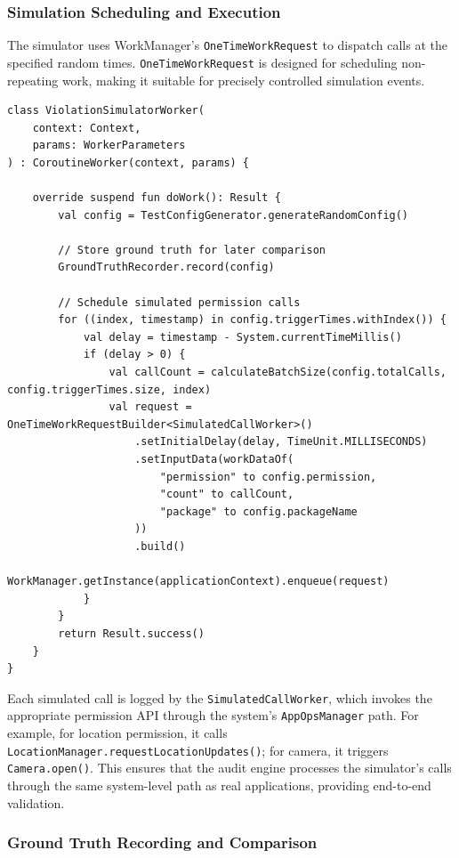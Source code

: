\subsubsection{Simulation Scheduling and Execution}

The simulator uses WorkManager's \texttt{OneTimeWorkRequest} to dispatch calls at the specified random times. \texttt{OneTimeWorkRequest} is designed for scheduling non-repeating work, making it suitable for precisely controlled simulation events.

\begin{lstlisting}[caption=Violation simulator worker]
class ViolationSimulatorWorker(
    context: Context,
    params: WorkerParameters
) : CoroutineWorker(context, params) {
    
    override suspend fun doWork(): Result {
        val config = TestConfigGenerator.generateRandomConfig()
        
        // Store ground truth for later comparison
        GroundTruthRecorder.record(config)
        
        // Schedule simulated permission calls
        for ((index, timestamp) in config.triggerTimes.withIndex()) {
            val delay = timestamp - System.currentTimeMillis()
            if (delay > 0) {
                val callCount = calculateBatchSize(config.totalCalls, config.triggerTimes.size, index)
                val request = OneTimeWorkRequestBuilder<SimulatedCallWorker>()
                    .setInitialDelay(delay, TimeUnit.MILLISECONDS)
                    .setInputData(workDataOf(
                        "permission" to config.permission,
                        "count" to callCount,
                        "package" to config.packageName
                    ))
                    .build()
                WorkManager.getInstance(applicationContext).enqueue(request)
            }
        }
        return Result.success()
    }
}
\end{lstlisting}

Each simulated call is logged by the \texttt{SimulatedCallWorker}, which invokes the appropriate permission API through the system's \texttt{AppOpsManager} path. For example, for location permission, it calls \texttt{LocationManager.requestLocationUpdates()}; for camera, it triggers \texttt{Camera.open()}. This ensures that the audit engine processes the simulator's calls through the same system-level path as real applications, providing end-to-end validation.

\subsubsection{Ground Truth Recording and Comparison}


